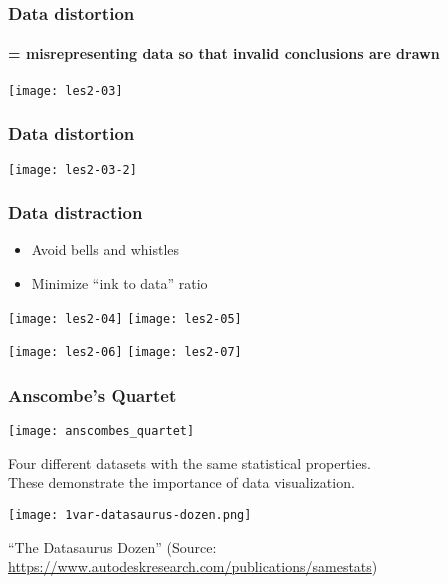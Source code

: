 \documentclass[aspectratio=169]{beamer}
\begin{document}
\begin{frame}
  \frametitle{Data distortion}
  \framesubtitle{= misrepresenting data so that invalid conclusions are drawn}
  
  \bigskip
  
  \begin{center}
    \texttt{[image: les2-03]}
  \end{center}
\end{frame}

\begin{frame}
  \frametitle{Data distortion}
  
  \begin{center}
    \texttt{[image: les2-03-2]}
  \end{center}
\end{frame}

\begin{frame}
  \frametitle{Data distraction}
  
  \begin{itemize}
    \item Avoid bells and whistles
    \item Minimize ``ink to data'' ratio
  \end{itemize}
  
  \centering
  \texttt{[image: les2-04]}
  \texttt{[image: les2-05]}
  
  \texttt{[image: les2-06]}
  \texttt{[image: les2-07]}
\end{frame}

\begin{frame}
  \frametitle{Anscombe's Quartet}
  
  \centering
  \texttt{[image: anscombes\_quartet]}
  
  Four different datasets with the same statistical properties.\\ These demonstrate the importance of data visualization.
\end{frame}

\begin{frame}[plain]
  \centering
  
  \texttt{[image: 1var-datasaurus-dozen.png]}
  
  ``The Datasaurus Dozen'' (Source: \url{https://www.autodeskresearch.com/publications/samestats})
\end{frame}
\end{document}
